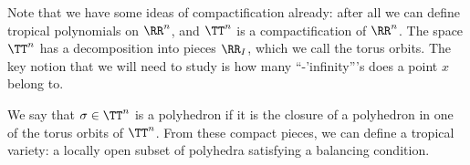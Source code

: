 

Note that we have some ideas of compactification already: after all we can define tropical polynomials on $\RR^n$, and $\TT^n$ is a compactification of $\RR^n$.
The space $\TT^n$ has a decomposition into pieces $\RR_I$, which we call the torus orbits. The key notion that we will need to study is how many ``-'infinity'''s does a point $x$ belong to. 

We say that $\sigma\in \TT^n$ is a polyhedron if it is the closure of a polyhedron in one of the torus orbits of $\TT^n$. 
From these compact pieces, we can define a tropical variety: a locally open subset of polyhedra satisfying a balancing condition. 